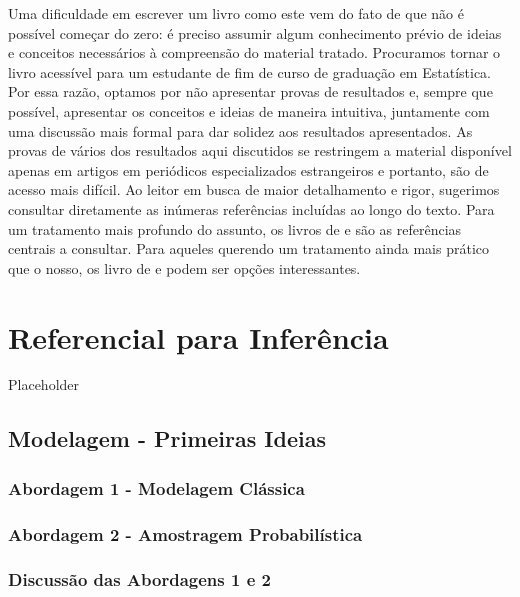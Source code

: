 \documentclass[
]{book}
\begin{document}
Uma dificuldade em escrever um livro como este vem do fato de que não
é possível começar do zero: é preciso assumir algum conhecimento prévio
de ideias e conceitos necessários à compreensão do material tratado.
Procuramos tornar o livro acessível para um estudante de fim de curso de
graduação em Estatística. Por essa razão, optamos por não apresentar provas
de resultados e, sempre que possível, apresentar os conceitos e ideias de maneira
intuitiva, juntamente com uma discussão mais formal para dar solidez aos
resultados apresentados. As provas de vários dos resultados aqui
discutidos se restringem a material disponível apenas em artigos em
periódicos especializados estrangeiros e portanto, são de acesso
mais difícil. Ao leitor em busca de maior detalhamento e rigor,
sugerimos consultar diretamente as inúmeras referências
incluídas ao longo do texto. Para um tratamento mais profundo do
assunto, os livros de \citep{SHS89} e \citep{CHSK2003} são as referências centrais
a consultar. Para aqueles querendo um tratamento ainda mais prático que o
nosso, os livro de \citep{lethonen} e \citep{heeringa} podem ser opções interessantes.

\hypertarget{refinf}{%
\chapter{Referencial para Inferência}\label{refinf}}

Placeholder

\hypertarget{classic}{%
\section{Modelagem - Primeiras Ideias}\label{classic}}

\hypertarget{abordagem-1---modelagem-cluxe1ssica}{%
\subsection{Abordagem 1 - Modelagem Clássica}\label{abordagem-1---modelagem-cluxe1ssica}}

\hypertarget{abordagem-2---amostragem-probabiluxedstica}{%
\subsection{Abordagem 2 - Amostragem Probabilística}\label{abordagem-2---amostragem-probabiluxedstica}}

\hypertarget{discussuxe3o-das-abordagens-1-e-2}{%
\subsection{Discussão das Abordagens 1 e 2}\label{discussuxe3o-das-abordagens-1-e-2}}
\end{document}
